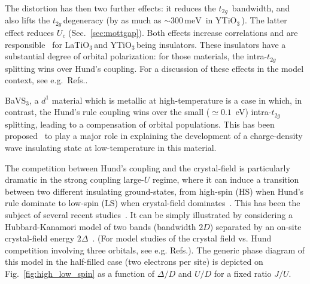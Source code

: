 \documentclass[]{ar2e-changed}%
\def\meV{\,\mbox{meV}\,}
\def\ttg{$t_{2g}\,$}
\def\SVO{SrVO$_3$\,}
\def\LTO{LaTiO$_3$\,}
\def\YTO{YTiO$_3$\,}
\begin{document}
The distortion has then two further effects: it reduces the \ttg
bandwidth, and also lifts the \ttg degeneracy (by as much as $\sim 300
\meV$ in \YTO). The latter effect reduces $U_c$ (Sec.~\ref{sec:mottgap}).  Both effects increase
correlations and are responsible~\cite{Pavarini_dist_d1_oxides} for \LTO and \YTO being insulators. 
These insulators have a substantial degree of orbital polarization: for those
materials, the intra-\ttg splitting wins over Hund's coupling. 
%
For a discussion of these effects in the model context, see e.g.~Refs.\cite{manini_orbital_2002_prb,poteryaev_crystalfield_prb_2008}. 

%
BaVS$_3$, a $d^1$ material which is metallic at high-temperature is a case in which, 
in contrast, the Hund's rule coupling wins over the small ($\simeq 0.1$~eV) intra-\ttg splitting, 
leading to a compensation of orbital populations. 
This has been proposed~\cite{Lechermann_BaVS3_prl} to play a major role in explaining the development of a charge-density wave insulating state 
at low-temperature in this material. 

The competition between Hund's coupling and the crystal-field is particularly dramatic in the strong coupling large-$U$ regime, 
where it can induce a transition between two different insulating ground-states, from high-spin (HS) 
when Hund's rule dominate to low-spin (LS) when crystal-field dominates~\cite{Bari_high-low_spin_Fe}. 
This has been the subject of several recent studies~\cite{werner07_hilowspin,kunes_MnO_natmat_2008,kunes_Fe2O3_prl_2009,
kunes_review_epjst_2009,kunes_HS_LS_prl_2011}. 
%
It can be simply illustrated by considering a Hubbard-Kanamori model of two bands (bandwidth $2D$) 
separated by an on-site crystal-field energy $2\Delta$~\cite{werner07_hilowspin,kunes_review_epjst_2009,kunes_HS_LS_prl_2011}. 
%
(For model studies of the crystal field vs. Hund competition involving three orbitals, 
see e.g.  Refs.\cite{werner09,demedici_MottHund,Kita_3band_2el_CfSplitting}). 
%
The generic phase diagram of this model in the half-filled case (two electrons per site) is depicted on 
Fig.~\ref{fig:high_low_spin} as a function of $\Delta/D$ and $U/D$ for a fixed ratio $J/U$. 
\end{document}

